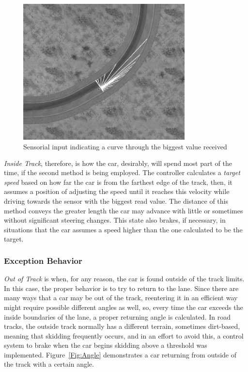 	\begin{figure}[h]
		
		\centering
		\includegraphics[width=250pt]{FarthestSensor}
		\caption{Sensorial input indicating a curve through the biggest value received}
		\label{Fig:FSensor}
		
	\end{figure}
	
	\emph{Inside Track}, therefore, is how the car, desirably, will spend most part of the time, if the second method is being employed. The controller calculates a \emph{target speed} based on how far the car is from the farthest edge of the track, then, it assumes a position of adjusting the speed until it reaches this velocity while driving towards the sensor with the biggest read value. The distance of this method conveys the greater length the car may advance with little or sometimes without significant steering changes. This state also brakes, if necessary, in situations that the car assumes a speed higher than the one calculated to be the target.
	
\subsubsection{Exception Behavior}
	
	
	\emph{Out of Track} is when, for any reason, the car is found outside of the track limits. In this case, the proper behavior is to try to return to the lane. Since there are many ways that a car may be out of the track, reentering it in an efficient way might require possible different angles as well, so, every time the car exceeds the inside boundaries of the lane, a proper returning angle is calculated. In road tracks, the outside track normally has a different terrain, sometimes dirt-based, meaning that skidding frequently occurs, and in an effort to avoid this, a control system to brake when the car begins skidding above a threshold was implemented. Figure~\ref{Fig:Angle} demonstrates a car returning from outside of the track with a certain angle. 
	

